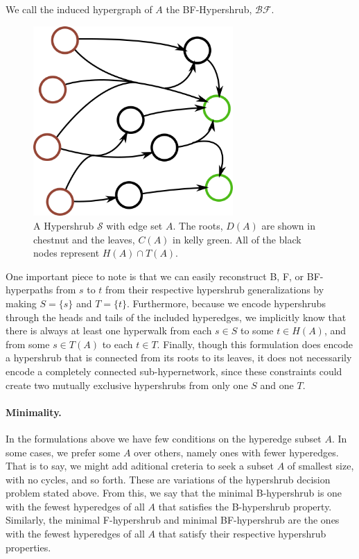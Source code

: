 \documentclass[12pt,twoside]{reedthesis}
\theoremstyle{definition}
\begin{document}
We call the induced hypergraph of $A$ the BF-Hypershrub, $\mathcal{BF}$.\par

\begin{figure}[!h]
  \begin{center}
    \includegraphics[width=3in]{BF-hypershrub}
  \caption[A Hypershrub $\mathcal{S}$ with edge set $A$.]{A Hypershrub $\mathcal{S}$ with edge set $A$. The roots, $D(A)$ are shown in chestnut and the leaves, $C(A)$ in kelly green. All of the black nodes represent $H(A) \cap T(A)$.}
  \label{fig:BF-hypershrub}
  \end{center}
\end{figure}

One important piece to note is that we can easily reconstruct B, F, or BF-hyperpaths from $s$ to $t$ from their respective hypershrub generalizations by making $S=\{s\}$ and $T=\{t\}$. Furthermore, because we encode hypershrubs through the heads and tails of the included hyperedges, we implicitly know that there is always at least one hyperwalk from each $s \in S$ to some $t \in H(A)$, and from some $s \in T(A)$ to each $t \in T$. Finally, though this formulation does encode a hypershrub that is connected from its roots to its leaves, it does not necessarily encode a completely connected sub-hypernetwork, since these constraints could create two mutually exclusive hypershrubs from only one $S$ and one $T$.

\paragraph{Minimality.}In the formulations above we have few conditions on the hyperedge subset $A$. In some cases, we prefer some $A$ over others, namely ones with fewer hyperedges. That is to say, we might add aditional creteria to seek a subset $A$ of smallest size, with no cycles, and so forth. These are variations of the hypershrub decision problem stated above. From this, we say that the minimal B-hypershrub is one with the fewest hyperedges of all $A$ that satisfies the B-hypershrub property. Similarly, the minimal F-hypershrub and minimal BF-hypershrub are the ones with the fewest hyperedges of all $A$ that satisfy their respective hypershrub properties.\par
\end{document}
